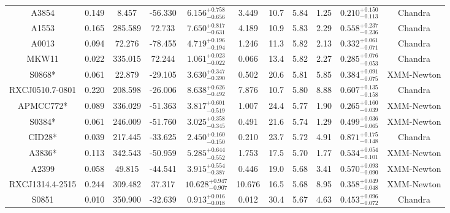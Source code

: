\documentclass{aa}   %
\begin{document}
\begin{table}[h!]
\begin{center}
\begin{tabular}{ c  c  c  c c c c c c c c }
A3854               		&		0.149	&	8.457	&	-56.330	& $	6.156^{+0.758}_{-0.656}$  &      3.449	&  10.7	&	5.84	&	1.25	&	$ 0.210^{+0.150}_{-0.113}  $ &	  Chandra     \\
A1553               		&		0.165	&	285.589	&	72.733	& $	7.650^{+0.817}_{-0.631}$  &      4.189	&  10.9	&	5.83	&	2.29	&	$ 0.558^{+0.237}_{-0.236}  $ &	  Chandra     \\
A0013               		&		0.094	&	72.276	&	-78.455	& $	4.719^{+0.196}_{-0.194}$  &      1.246	&  11.3	&	5.82	&	2.13	&	$ 0.332^{+0.061}_{-0.071}  $ &	  Chandra     \\
MKW11               		&		0.022	&	335.015	&	72.244	& $	1.061^{+0.023}_{-0.022}$  &      0.066	&  13.4	&	5.82	&	2.27	&	$ 0.285^{+0.076}_{-0.053}  $ &	  Chandra     \\
S0868*              		&		0.061	&	22.879	&	-29.105	& $	3.630^{+0.347}_{-0.390}$  &      0.502	&  20.6	&	5.81	&	5.85	&	$ 0.384^{+0.091}_{-0.075}  $ &	 XMM-Newton   \\
RXCJ0510.7-0801     		&		0.220	&	208.598	&	-26.006	& $	8.638^{+0.626}_{-0.492}$  &      7.876	&  10.7	&	5.80	&	8.88	&	$ 0.607^{+0.135}_{-0.158}  $ &	 Chandra      \\
APMCC772*           		&		0.089	&	336.029	&	-51.363	& $	3.817^{+0.601}_{-0.519}$  &      1.007	&  24.4	&	5.77	&	1.90	&	$ 0.265^{+0.160}_{-0.039}  $ &	 XMM-Newton   \\
S0384*              		&		0.061	&	246.009	&	-51.760	& $	3.025^{+0.358}_{-0.345}$  &      0.491	&  21.6	&	5.74	&	1.29	&	$ 0.499^{+0.036}_{-0.065}  $ &	  XMM-Newton  \\
CID28*              		&		0.039	&	217.445	&	-33.625	& $	2.450^{+0.160}_{-0.150}$  &      0.210	&  23.7	&	5.72	&	4.91	&	$ 0.871^{+0.175}_{-0.148}  $ &	  Chandra     \\
A3836*              		&		0.113	&	342.543	&	-50.959	& $	5.285^{+0.644}_{-0.552}$  &      1.753	&  17.5	&	5.70	&	1.77	&	$ 0.534^{+0.054}_{-0.101}  $ &	  XMM-Newton  \\
A2399               		&		0.058	&	49.815	&	-44.541	& $	3.915^{+0.554}_{-0.387}$  &      0.446	&  19.0	&	5.68	&	3.41	&	$ 0.570^{+0.093}_{-0.090}  $ &	  XMM-Newton  \\
RXCJ1314.4-2515     		&		0.244	&	309.482	&	37.317	& $ 10.628^{+0.947}_{-0.907}$ &     10.676	&  16.5	&	5.68	&	8.95	&	$ 0.358^{+0.049}_{-0.048}  $ &	 XMM-Newton   \\
S0851               		&		0.010	&	350.900	&	-32.639	& $	0.913^{+0.016}_{-0.018}$  &      0.012	&  30.4	&	5.67	&	4.63	&	$ 0.453^{+0.096}_{-0.072}  $ &	 Chandra      \\

\end{tabular}
\end{center}
\end{table}
\end{document}
